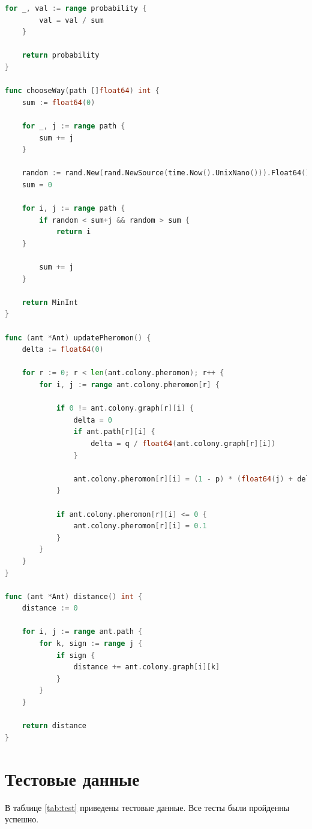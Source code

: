 \documentclass[12pt]{report}
\begin{document}
\begin{lstlisting}[label=some-code,caption=Муравьиный алгоритм, language=go]
	for _, val := range probability {
		val = val / sum
	}
	
	return probability
}

func chooseWay(path []float64) int {
	sum := float64(0)
	
	for _, j := range path {
		sum += j
	}
	
	random := rand.New(rand.NewSource(time.Now().UnixNano())).Float64() * sum
	sum = 0
	
	for i, j := range path {
		if random < sum+j && random > sum {
			return i
	}
	
		sum += j
	}
	
	return MinInt
}

func (ant *Ant) updatePheromon() {
	delta := float64(0)
	
	for r := 0; r < len(ant.colony.pheromon); r++ {
		for i, j := range ant.colony.pheromon[r] {
	
			if 0 != ant.colony.graph[r][i] {
				delta = 0
				if ant.path[r][i] {
					delta = q / float64(ant.colony.graph[r][i])
				}
	
				ant.colony.pheromon[r][i] = (1 - p) * (float64(j) + delta)
			}
	
			if ant.colony.pheromon[r][i] <= 0 {
				ant.colony.pheromon[r][i] = 0.1
			}
		}
	}
}

func (ant *Ant) distance() int {
	distance := 0

	for i, j := range ant.path {
		for k, sign := range j {
			if sign {
				distance += ant.colony.graph[i][k]
			}
		}
	}
	
	return distance
}

\end{lstlisting}

\section{Тестовые данные}

В таблице \ref{tab:test} приведены тестовые данные. Все тесты были пройденны успешно.
\end{document}
